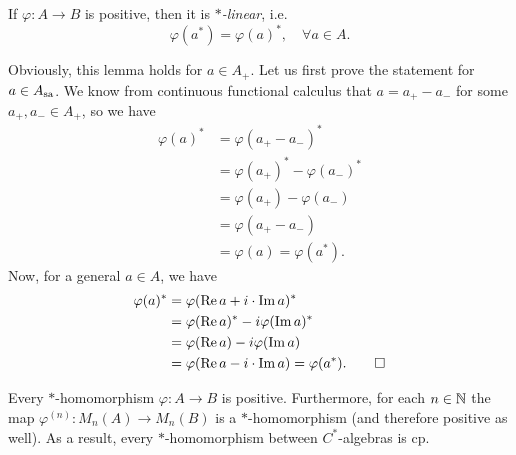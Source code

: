 \begin{lemma}
    If $\varphi: A \to B$ is positive, then it is \emph{$*$-linear}, i.e. 
    $$\varphi(a^*) = \varphi(a) ^*,\quad \forall a \in A.$$
\end{lemma}

\begin{myproof}
    Obviously, this lemma holds for $a \in A_+$.
    Let us first prove the statement for $a \in A_{\operatorname{sa}}$. We know from continuous functional calculus 
    that $a = a_+ - a_-$ for some $a_+, a_- \in A_+$, so we have 
    \begin{align*}
        \varphi (a)^* &= \varphi(a_+ - a_-)^*\\
        &= \varphi(a_+)^* - \varphi(a_-)^*\\
        &= \varphi(a_+) - \varphi(a_-)\\
        &= \varphi(a_+ - a_-)\\
        &= \varphi(a) = \varphi(a^*).
    \end{align*}
    Now, for a general $a \in A$, we have 
    \begin{align*}
        \varphi(a)^* &= \varphi(\operatorname{Re} a + i \cdot \operatorname{Im} a)^*\\
        &= \varphi(\operatorname{Re} a)^* - i \varphi(\operatorname{Im} a)^*\\
        &= \varphi(\operatorname{Re} a) - i \varphi (\operatorname{Im} a)\\
        &= \varphi(\operatorname{Re} a - i \cdot \operatorname{Im} a) = \varphi(a^*). \qedhere
    \end{align*}
\end{myproof}

\begin{example}
    Every $*$-homomorphism $\varphi: A \to B$ is positive.
    Furthermore, for each $n \in \mathbb {N}$ the map $\varphi^{(n)}: M_n (A) \to M_n (B)$
    is a $*$-homomorphism (and therefore positive as well).
    As a result, every $*$-homomorphism between $C^*$-algebras is cp.
\end{example}

